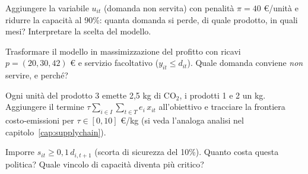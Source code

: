 \begin{esercizio}
Aggiungere la variabile $u_{it}$ (domanda non servita) con penalità
$\pi = 40$ \euro/unità e ridurre la capacità al 90\%: quanta domanda si perde, di
quale prodotto, in quali mesi? Interpretare la scelta del modello.
\end{esercizio}

\begin{esercizio}
Trasformare il modello in massimizzazione del profitto con ricavi
$p = (20, 30, 42)$ \euro{} e servizio facoltativo ($y_{it} \le d_{it}$).
Quale domanda conviene \emph{non} servire, e perché?
\end{esercizio}

\begin{esercizio}[emissioni]
Ogni unità del prodotto 3 emette 2{,}5 kg di CO$_2$, i prodotti 1 e 2 un kg. Aggiungere il termine
$\tau \sum_{i \in I}\sum_{t \in T} e_i\, x_{it}$ all'obiettivo e tracciare la frontiera costo-emissioni per
$\tau \in [0, 10]$ \euro/kg (si veda l'analoga analisi nel
capitolo~\ref{cap:supplychain}).
\end{esercizio}

\begin{esercizio}
Imporre $s_{it} \ge 0{,}1\, d_{i,t+1}$ (scorta di sicurezza del 10\%). Quanto costa
questa politica? Quale vincolo di capacità diventa più critico?
\end{esercizio}
